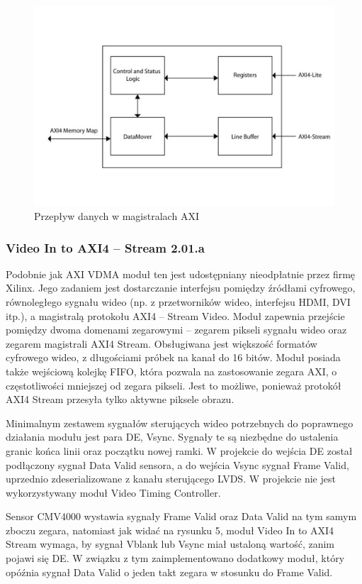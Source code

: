 \documentclass[a4paper,11pt,oneside]{report}  %
\begin{document}
\begin{figure}[H]
	\centering
	\includegraphics[width=14cm]{data3.png}
	\caption{Przepływ danych w magistralach AXI}
	\label{fig:Zynq3}
\end{figure}

\subsubsection{Video In to AXI4 – Stream 2.01.a} 

Podobnie jak AXI VDMA moduł ten jest udostępniany nieodpłatnie przez firmę Xilinx. Jego zadaniem jest dostarczanie interfejsu pomiędzy źródłami cyfrowego, równoległego sygnału wideo (np. z przetworników wideo, interfejsu HDMI, DVI itp.), a magistralą protokołu AXI4 – Stream Video. Moduł zapewnia przejście pomiędzy dwoma domenami zegarowymi – zegarem pikseli sygnału wideo oraz zegarem magistrali AXI4 Stream. Obsługiwana jest większość formatów cyfrowego wideo, z długościami próbek na kanał do 16 bitów. Moduł posiada także wejściową kolejkę FIFO, która pozwala na zastosowanie zegara AXI, o częstotliwości mniejszej od zegara pikseli. Jest to możliwe, ponieważ protokół AXI4 Stream przesyła tylko aktywne piksele obrazu. 

Minimalnym zestawem sygnałów sterujących wideo potrzebnych do poprawnego działania modułu jest para DE, Vsync. Sygnały te są niezbędne do ustalenia granic końca linii oraz początku nowej ramki. W projekcie do wejścia DE został podłączony sygnał Data Valid sensora, a do wejścia Vsync sygnał Frame Valid, uprzednio zdeserializowane z kanału sterującego LVDS. W projekcie nie jest wykorzystywany moduł Video Timing Controller. 

Sensor CMV4000 wystawia sygnały Frame Valid oraz Data Valid na tym samym zboczu zegara, natomiast jak widać na rysunku 5, moduł Video In to AXI4 Stream wymaga, by sygnał Vblank lub Vsync miał ustaloną wartość, zanim pojawi się DE. W związku z tym zaimplementowano dodatkowy moduł, który opóźnia sygnał Data Valid o jeden takt zegara w stosunku do Frame Valid.
\end{document}
